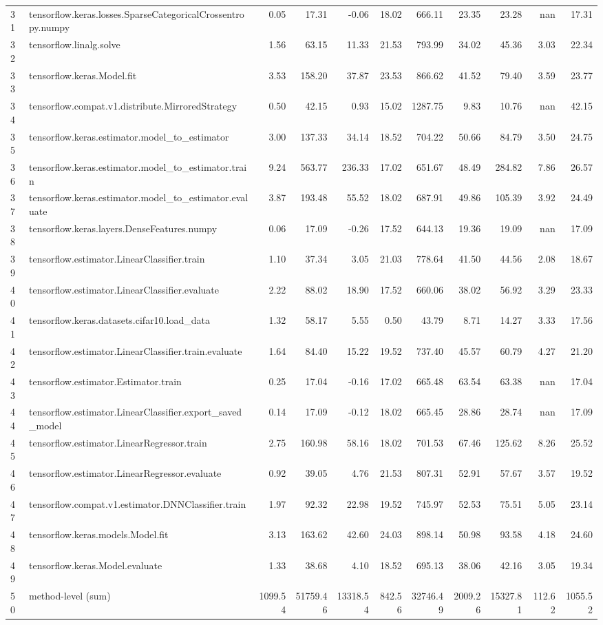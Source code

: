 \begin{tabular}{llrrrrrrrrr}
31 & tensorflow.keras.losses.SparseCategoricalCrossentropy.numpy & 0.05 & 17.31 & -0.06 & 18.02 & 666.11 & 23.35 & 23.28 & nan & 17.31 \\
32 & tensorflow.linalg.solve & 1.56 & 63.15 & 11.33 & 21.53 & 793.99 & 34.02 & 45.36 & 3.03 & 22.34 \\
33 & tensorflow.keras.Model.fit & 3.53 & 158.20 & 37.87 & 23.53 & 866.62 & 41.52 & 79.40 & 3.59 & 23.77 \\
34 & tensorflow.compat.v1.distribute.MirroredStrategy & 0.50 & 42.15 & 0.93 & 15.02 & 1287.75 & 9.83 & 10.76 & nan & 42.15 \\
35 & tensorflow.keras.estimator.model_to_estimator & 3.00 & 137.33 & 34.14 & 18.52 & 704.22 & 50.66 & 84.79 & 3.50 & 24.75 \\
36 & tensorflow.keras.estimator.model_to_estimator.train & 9.24 & 563.77 & 236.33 & 17.02 & 651.67 & 48.49 & 284.82 & 7.86 & 26.57 \\
37 & tensorflow.keras.estimator.model_to_estimator.evaluate & 3.87 & 193.48 & 55.52 & 18.02 & 687.91 & 49.86 & 105.39 & 3.92 & 24.49 \\
38 & tensorflow.keras.layers.DenseFeatures.numpy & 0.06 & 17.09 & -0.26 & 17.52 & 644.13 & 19.36 & 19.09 & nan & 17.09 \\
39 & tensorflow.estimator.LinearClassifier.train & 1.10 & 37.34 & 3.05 & 21.03 & 778.64 & 41.50 & 44.56 & 2.08 & 18.67 \\
40 & tensorflow.estimator.LinearClassifier.evaluate & 2.22 & 88.02 & 18.90 & 17.52 & 660.06 & 38.02 & 56.92 & 3.29 & 23.33 \\
41 & tensorflow.keras.datasets.cifar10.load_data & 1.32 & 58.17 & 5.55 & 0.50 & 43.79 & 8.71 & 14.27 & 3.33 & 17.56 \\
42 & tensorflow.estimator.LinearClassifier.train.evaluate & 1.64 & 84.40 & 15.22 & 19.52 & 737.40 & 45.57 & 60.79 & 4.27 & 21.20 \\
43 & tensorflow.estimator.Estimator.train & 0.25 & 17.04 & -0.16 & 17.02 & 665.48 & 63.54 & 63.38 & nan & 17.04 \\
44 & tensorflow.estimator.LinearClassifier.export_saved_model & 0.14 & 17.09 & -0.12 & 18.02 & 665.45 & 28.86 & 28.74 & nan & 17.09 \\
45 & tensorflow.estimator.LinearRegressor.train & 2.75 & 160.98 & 58.16 & 18.02 & 701.53 & 67.46 & 125.62 & 8.26 & 25.52 \\
46 & tensorflow.estimator.LinearRegressor.evaluate & 0.92 & 39.05 & 4.76 & 21.53 & 807.31 & 52.91 & 57.67 & 3.57 & 19.52 \\
47 & tensorflow.compat.v1.estimator.DNNClassifier.train & 1.97 & 92.32 & 22.98 & 19.52 & 745.97 & 52.53 & 75.51 & 5.05 & 23.14 \\
48 & tensorflow.keras.models.Model.fit & 3.13 & 163.62 & 42.60 & 24.03 & 898.14 & 50.98 & 93.58 & 4.18 & 24.60 \\
49 & tensorflow.keras.Model.evaluate & 1.33 & 38.68 & 4.10 & 18.52 & 695.13 & 38.06 & 42.16 & 3.05 & 19.34 \\
50 & method-level (sum) & 1099.54 & 51759.46 & 13318.54 & 842.56 & 32746.49 & 2009.26 & 15327.81 & 112.62 & 1055.52 \\
\end{tabular}
